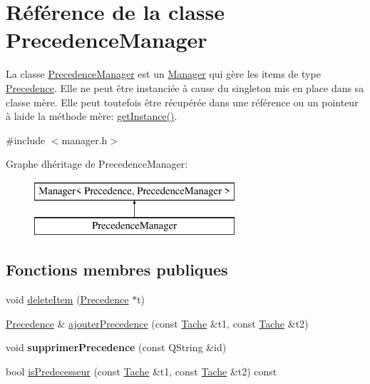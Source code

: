 \hypertarget{class_precedence_manager}{}\section{Référence de la classe Precedence\+Manager}
\label{class_precedence_manager}


La classe \hyperlink{class_precedence_manager}{Precedence\+Manager} est un \hyperlink{class_manager}{Manager} qui gère les items de type \hyperlink{class_precedence}{Precedence}. Elle ne peut être instanciée à cause du singleton mis en place dans sa classe mère. Elle peut toutefois être récupérée dans une référence ou un pointeur à l\textquotesingle{}aide la méthode mère\+: \hyperlink{class_manager_a8372e4f1e14f3605a57d839b152325ed}{get\+Instance()}.  




{\ttfamily \#include $<$manager.\+h$>$}

Graphe d\textquotesingle{}héritage de Precedence\+Manager\+:\begin{figure}[H]
\begin{center}
\leavevmode
\includegraphics[height=2.000000cm]{class_precedence_manager}
\end{center}
\end{figure}
\subsection*{Fonctions membres publiques}
\begin{DoxyCompactItemize}
\item 
void \hyperlink{class_precedence_manager_ae59ff8a8e92d171c607e988d74a8fe1f}{delete\+Item} (\hyperlink{class_precedence}{Precedence} $\ast$t)
\item 
\hyperlink{class_precedence}{Precedence} \& \hyperlink{class_precedence_manager_ad8f271ddf75e6aa4b5a51eadaab662d0}{ajouter\+Precedence} (const \hyperlink{class_tache}{Tache} \&t1, const \hyperlink{class_tache}{Tache} \&t2)
\item 
\hypertarget{class_precedence_manager_acb5b927060191c478f496fbe30cd521d}{}void {\bfseries supprimer\+Precedence} (const Q\+String \&id)\label{class_precedence_manager_acb5b927060191c478f496fbe30cd521d}

\item 
bool \hyperlink{class_precedence_manager_ab50a623212a24469debe33e9df71037f}{is\+Predecesseur} (const \hyperlink{class_tache}{Tache} \&t1, const \hyperlink{class_tache}{Tache} \&t2) const 
\end{DoxyCompactItemize}
